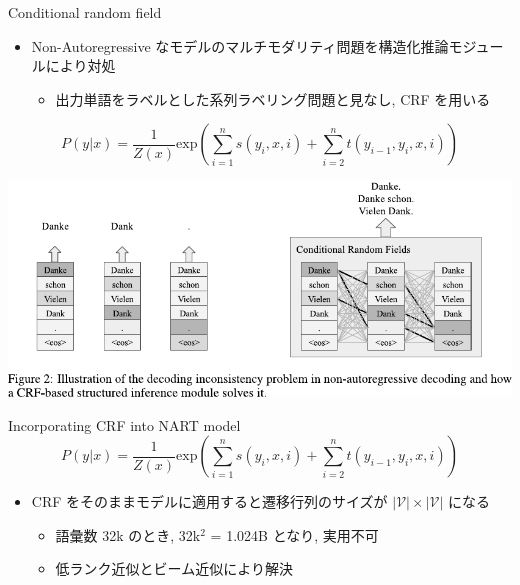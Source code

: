 \documentclass[unicode, 12pt, aspectratio=43]{beamer}
\begin{document}
\begin{frame}[label={sec:orge07e6cc}]{Conditional random field}
\begin{itemize}
\item Non-Autoregressive なモデルのマルチモダリティ問題を構造化推論モジュールにより対処
\begin{itemize}
\item 出力単語をラベルとした系列ラベリング問題と見なし, CRF を用いる
\end{itemize}
\end{itemize}
\begin{equation*}
    P(y|x) = \frac{1}{Z(x)} \mathrm{exp}(\sum_{i=1}^n s(y_i, x, i) + \sum_{i=2}^n t(y_{i-1}, y_i, x, i))
\end{equation*}

\begin{center}
\includegraphics[width=0.9\linewidth]{./figure/Figure2.pdf}
\end{center}
\end{frame}

\begin{frame}[label={sec:orgc4097bb}]{Incorporating CRF into NART model}
\begin{equation*}
    P(y|x) = \frac{1}{Z(x)} \mathrm{exp}(\sum_{i=1}^n s(y_i, x, i) + \sum_{i=2}^n t(y_{i-1}, y_i, x, i))
\end{equation*}

\begin{itemize}
\item CRF をそのままモデルに適用すると遷移行列のサイズが \(|\mathcal{V}| \times |\mathcal{V}|\) になる
\begin{itemize}
\item 語彙数 32k のとき, 32k\(^{\text{2}}\) = 1.024B となり, 実用不可
\item 低ランク近似とビーム近似により解決
\end{itemize}
\end{itemize}
\end{frame}
\end{document}

